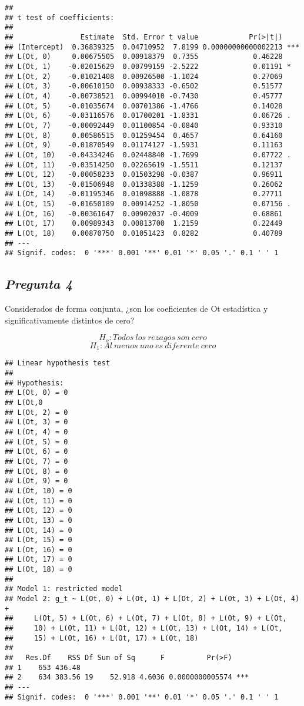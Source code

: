 \documentclass[
  12pt,
]{article}
\begin{document}
\begin{verbatim}
## 
## t test of coefficients:
## 
##                Estimate  Std. Error t value            Pr(>|t|)    
## (Intercept)  0.36839325  0.04710952  7.8199 0.00000000000002213 ***
## L(Ot, 0)     0.00675505  0.00918379  0.7355             0.46228    
## L(Ot, 1)    -0.02015629  0.00799159 -2.5222             0.01191 *  
## L(Ot, 2)    -0.01021408  0.00926500 -1.1024             0.27069    
## L(Ot, 3)    -0.00610150  0.00938333 -0.6502             0.51577    
## L(Ot, 4)    -0.00738521  0.00994010 -0.7430             0.45777    
## L(Ot, 5)    -0.01035674  0.00701386 -1.4766             0.14028    
## L(Ot, 6)    -0.03116576  0.01700201 -1.8331             0.06726 .  
## L(Ot, 7)    -0.00092449  0.01100854 -0.0840             0.93310    
## L(Ot, 8)     0.00586515  0.01259454  0.4657             0.64160    
## L(Ot, 9)    -0.01870549  0.01174127 -1.5931             0.11163    
## L(Ot, 10)   -0.04334246  0.02448840 -1.7699             0.07722 .  
## L(Ot, 11)   -0.03514250  0.02265619 -1.5511             0.12137    
## L(Ot, 12)   -0.00058233  0.01503298 -0.0387             0.96911    
## L(Ot, 13)   -0.01506948  0.01338388 -1.1259             0.26062    
## L(Ot, 14)   -0.01195346  0.01098888 -1.0878             0.27711    
## L(Ot, 15)   -0.01650189  0.00914252 -1.8050             0.07156 .  
## L(Ot, 16)   -0.00361647  0.00902037 -0.4009             0.68861    
## L(Ot, 17)    0.00989343  0.00813700  1.2159             0.22449    
## L(Ot, 18)    0.00870750  0.01051423  0.8282             0.40789    
## ---
## Signif. codes:  0 '***' 0.001 '**' 0.01 '*' 0.05 '.' 0.1 ' ' 1
\end{verbatim}

\subsection{\texorpdfstring{\textbf{\emph{Pregunta
4}}}{Pregunta 4}}\label{pregunta-4}

Considerados de forma conjunta, ¿son los coeficientes de Ot estadística
y significativamente distintos de cero?

\[H_o: Todos\ los\ rezagos\ son\ cero \]
\[H_1: Al\ menos\ uno\ es\ diferente\ cero \]

\begin{verbatim}
## Linear hypothesis test
## 
## Hypothesis:
## L(Ot, 0) = 0
## L(Ot,0
## L(Ot, 2) = 0
## L(Ot, 3) = 0
## L(Ot, 4) = 0
## L(Ot, 5) = 0
## L(Ot, 6) = 0
## L(Ot, 7) = 0
## L(Ot, 8) = 0
## L(Ot, 9) = 0
## L(Ot, 10) = 0
## L(Ot, 11) = 0
## L(Ot, 12) = 0
## L(Ot, 13) = 0
## L(Ot, 14) = 0
## L(Ot, 15) = 0
## L(Ot, 16) = 0
## L(Ot, 17) = 0
## L(Ot, 18) = 0
## 
## Model 1: restricted model
## Model 2: g_t ~ L(Ot, 0) + L(Ot, 1) + L(Ot, 2) + L(Ot, 3) + L(Ot, 4) + 
##     L(Ot, 5) + L(Ot, 6) + L(Ot, 7) + L(Ot, 8) + L(Ot, 9) + L(Ot, 
##     10) + L(Ot, 11) + L(Ot, 12) + L(Ot, 13) + L(Ot, 14) + L(Ot, 
##     15) + L(Ot, 16) + L(Ot, 17) + L(Ot, 18)
## 
##   Res.Df    RSS Df Sum of Sq      F          Pr(>F)    
## 1    653 436.48                                        
## 2    634 383.56 19    52.918 4.6036 0.0000000005574 ***
## ---
## Signif. codes:  0 '***' 0.001 '**' 0.01 '*' 0.05 '.' 0.1 ' ' 1
\end{verbatim}
\end{document}
